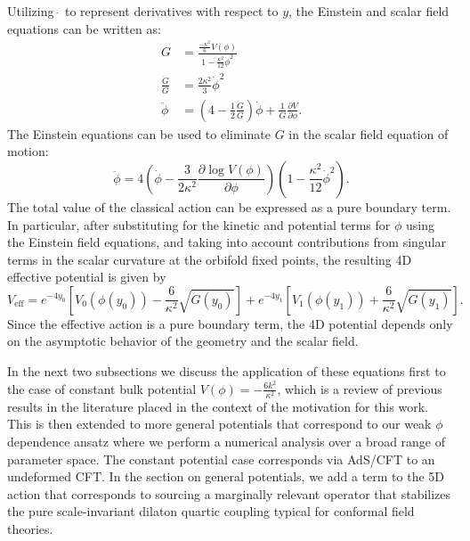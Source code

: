 \documentclass[12pt]{article}
\begin{document}
Utilizing $\dot{\ }$ to represent derivatives with respect to $y$, the Einstein and scalar field equations can be written as:
\begin{align}
G &= \frac{\frac{-\kappa^2}{6} V(\phi)}{1- \frac{\kappa^2}{12} \dot{\phi}^2} \label{eq:GEOM} \\
\frac{\dot{G}}{G} &= \frac{2 \kappa^2}{3} \dot{\phi}^2 \label{eq:dotGEOM} \\
\ddot{\phi} &= \left( 4 - \frac{1}{2} \frac{\dot{G}}{G} \right) \dot{\phi} + \frac{1}{G} \frac{\partial V}{\partial \phi}.
\end{align}
The Einstein equations can be used to eliminate $G$ in the scalar field equation of motion:
\begin{equation}
\ddot{\phi} = 4 \left( \dot{\phi} - \frac{3}{2\kappa^2} \frac{\partial \log V(\phi)}{\partial \phi} \right) \left( 1 - \frac{\kappa^2}{12} \dot{\phi}^2 \right).
\label{eq:PHIEOM}
\end{equation}
 The total value of the classical action can be expressed as a pure boundary term.   In particular, after substituting for the kinetic and potential terms for $\phi$ using the Einstein field equations, and taking into account contributions from singular terms in the scalar curvature at the orbifold fixed points,  the resulting 4D effective potential is given by~\cite{Bellazzini:2013fga}
 \begin{equation}
 V_\text{eff} = e^{-4 y_0} \left[ V_0 (\phi (y_0)) - \frac{6}{\kappa^2} \sqrt{G(y_0)} \right] + e^{-4 y_1} \left[ V_1 (\phi (y_1)) + \frac{6}{\kappa^2} \sqrt{G(y_1)} \right].
 \end{equation}
Since the effective action is a pure boundary term, the 4D potential depends only on the asymptotic behavior of the geometry and the scalar field.
 
In the next two subsections we discuss the application of these equations first to the case of constant bulk potential $V(\phi) = -\frac{6k^2}{\kappa^2}$, which is a review of previous results in the literature placed in the context of the motivation for this work.  This is then extended to more general potentials that correspond to our weak $\phi$ dependence ansatz where we perform a numerical analysis over a broad range of parameter space.  The constant potential case corresponds via AdS/CFT to an undeformed CFT.  In the section on general potentials, we add a term to the 5D action that corresponds to sourcing a marginally relevant operator that stabilizes the pure scale-invariant dilaton quartic coupling typical for conformal field theories.
\end{document}
